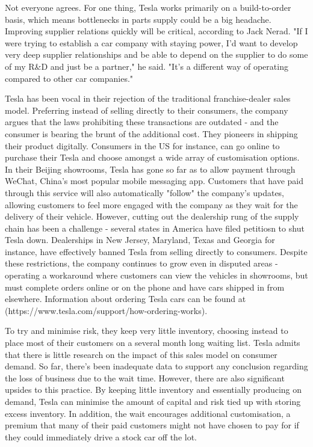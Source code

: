 \documentclass[12pt]{article}
\begin{document}
Not everyone agrees. For one thing, Tesla works primarily on a build-to-order basis, which means bottlenecks in parts supply could be a big headache. Improving supplier relations quickly will be critical, according to Jack Nerad. "If I were trying to establish a car company with staying power, I’d want to develop very deep supplier relationships and be able to depend on the supplier to do some of my R\&D and just be a partner," he said. "It’s a different way of operating compared to other car companies."

Tesla has been vocal in their rejection of the traditional franchise-dealer sales model. Preferring instead of selling directly to their consumers, the company argues that the laws prohibiting these transactions are outdated - and the consumer is bearing the brunt of the additional cost. They pioneers in shipping their product digitally. Consumers in the US for instance, can go online to purchase their Tesla and choose amongst a wide array of customisation options. In their Beijing showrooms, Tesla has gone so far as to allow payment through WeChat, China’s most popular mobile messaging app. Customers that have paid through this service will also automatically "follow" the company’s updates, allowing customers to feel more engaged with the company as they wait for the delivery of their vehicle. However, cutting out the dealership rung of the supply chain has been a challenge - several states in America have filed petitiosn to shut Tesla down. Dealerships in New Jersey, Maryland, Texas and Georgia for instance, have effectively banned Tesla from selling directly to consumers. Despite these restrictions, the company continues to grow even in disputed areas - operating a workaround where customers can view the vehicles in showrooms, but must complete orders online or on the phone and have cars shipped in from elsewhere. Information about ordering Tesla cars can be found at (https://www.tesla.com/support/how-ordering-works).

To try and minimise risk, they keep very little inventory, choosing instead to place most of their customers on a several month long waiting list. Tesla admits that there is little research on the impact of this sales model on consumer demand. So far, there’s been inadequate data to support any conclusion regarding the loss of business due to the wait time. However, there are also significant upsides to this practice. By keeping little inventory and essentially producing on demand, Tesla can minimise the amount of capital and risk tied up with storing excess inventory. In addition, the wait encourages additional customisation, a premium that many of their paid customers might not have chosen to pay for if they could immediately drive a stock car off the lot.
\end{document}
